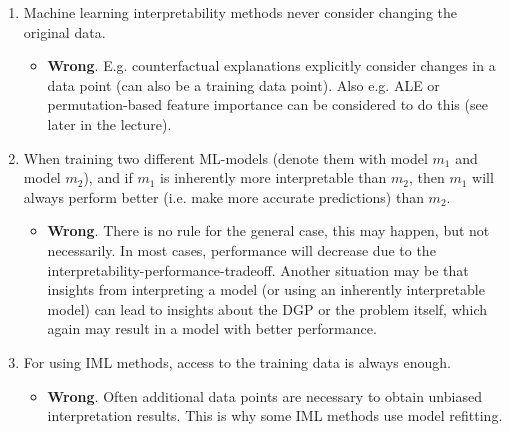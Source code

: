 \begin{enumerate}
    \item Machine learning interpretability methods never consider changing the original data.
    \begin{itemize}
    	\item[$\Rightarrow$] \textbf{Wrong}.
    	E.g. counterfactual explanations explicitly consider changes in a data point (can also be a training data point). Also e.g. ALE or permutation-based feature importance can be considered to do this (see later in the lecture).
    \end{itemize}


	\item When training two different ML-models (denote them with model \(m_1\) and model $m_2$), and if $m_1$ is inherently more interpretable than \(m_2\), then $m_1$ will always perform better (i.e. make more accurate predictions) than $m_2$.
	\begin{itemize}
		\item[$\Rightarrow$] \textbf{Wrong}. There is no rule for the general case, this may happen, but not necessarily. In most cases, performance will decrease due to the interpretability-performance-tradeoff. Another situation may be that insights from interpreting a model (or using an inherently interpretable model) can lead to insights about the DGP or the problem itself, which again may result in a model with better performance.
	\end{itemize}


	\item For using IML methods, access to the training data is always enough.
	\begin{itemize}
		\item[$\Rightarrow$] \textbf{Wrong}. Often additional data points are necessary to obtain unbiased interpretation results. This is why some IML methods use model refitting.
	\end{itemize}


\end{enumerate}
